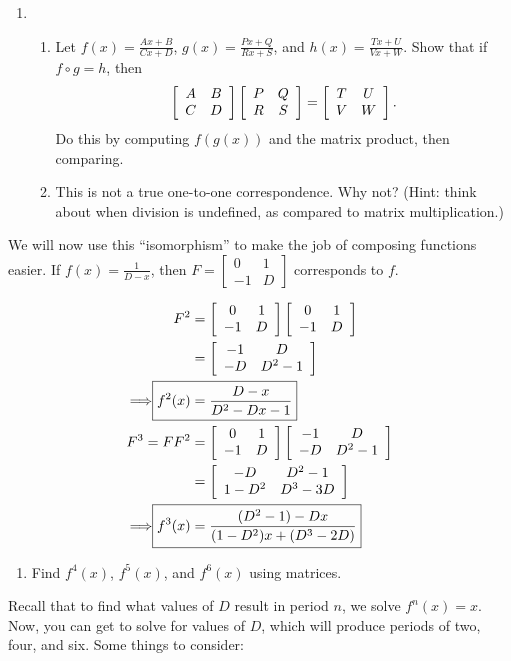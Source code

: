 \documentclass[../gatm.tex]{subfiles}
\begin{document}
\begin{enumerate}
\setcounter{enumi}{\value{problem_i}}
\item \begin{enumerate}
\item Let $f(x)=\frac{Ax+B}{Cx+D}$, $g(x)=\frac{Px+Q}{Rx+S}$, and $h(x)=\frac{Tx+U}{Vx+W}$. Show that if $f\circ g = h$, then
$$\left[\begin{array}{cc} A & B \\ C & D \end{array}\right]\left[\begin{array}{cc} P & Q \\ R & S \end{array}\right]=\left[\begin{array}{cc} T & U \\ V & W \end{array}\right].$$
Do this by computing $f(g(x))$ and the matrix product, then comparing.
\item This is not a true one-to-one correspondence. Why not? (Hint: think about when division is undefined, as compared to matrix multiplication.)
\end{enumerate}
\setcounter{problem_i}{\value{enumi}}
\end{enumerate}

We will now use this ``isomorphism'' to make the job of composing functions easier. If $f(x)=\frac{1}{D-x}$, then $F=\left[\begin{smallmatrix} 0 & 1 \\ -1 & D \end{smallmatrix}\right]$ corresponds to $f$.

\begin{align*}
F^2 &= \twomat{0}{1}{-1}{D}\twomat{0}{1}{-1}{D} \\
&= \twomat{-1}{D}{-D}{D^2-1} \\
\Longrightarrow \Aboxed{f^2(x) &= \frac{D-x}{D^2-Dx-1}} \\
F^3 = FF^2 &= \twomat{0}{1}{-1}{D}\twomat{-1}{D}{-D}{D^2-1} \\
&= \twomat{-D}{D^2-1}{1-D^2}{D^3-3D} \\
\Longrightarrow \Aboxed{f^3(x) &= \frac{(D^2-1)-Dx}{(1-D^2)x+(D^3-2D)}} \\
\end{align*}

\begin{enumerate}
\setcounter{enumi}{\value{problem_i}}
\item Find $f^4(x)$, $f^5(x)$, and $f^6(x)$ using matrices.
\setcounter{problem_i}{\value{enumi}}
\end{enumerate}

Recall that to find what values of $D$ result in period $n$, we solve $f^n(x)=x$. Now, you can get to solve for values of $D$, which will produce periods of two, four, and six. Some things to consider:
\end{document}
